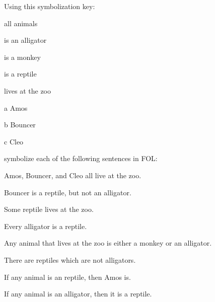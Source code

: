 \solutions
\problempart\label{pr.FOLalligators}
Using this symbolization key:
\begin{ekey}
\item[\text{domain}] all animals
\item[\atom{A}{x}]  is an alligator
\item[\atom{M}{x}]  is a monkey
\item[\atom{R}{x}]  is a reptile
\item[\atom{Z}{x}]  lives at the zoo
\item[a] Amos
\item[b] Bouncer
\item[c] Cleo
\end{ekey}
symbolize each of the following sentences in FOL:
\begin{compactlist}
\item Amos, Bouncer, and Cleo all live at the zoo.
\item[] 
\item Bouncer is a reptile, but not an alligator.
\item[] 
\item Some reptile lives at the zoo.
\item[] 
\item Every alligator is a reptile.
\item[] 
\item Any animal that lives at the zoo is either a monkey or an alligator.
\item[] 
\item There are reptiles which are not alligators.
\item[] 
\item If any animal is an reptile, then Amos is.
\item[] 
\item If any animal is an alligator, then it is a reptile.
\item[] 
\end{compactlist}

